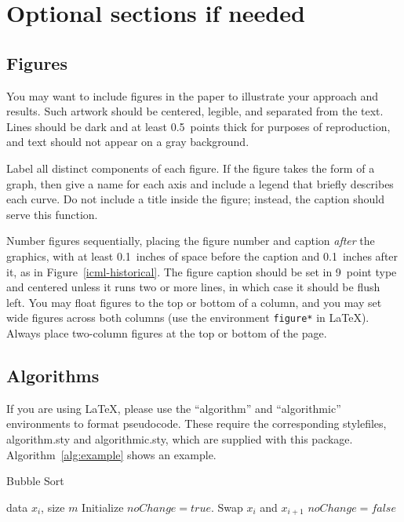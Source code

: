\documentclass{article}
\begin{document}
\section{Optional sections if needed}

\subsection{Figures}

You may want to include figures in the paper to illustrate
your approach and results. Such artwork should be centered,
legible, and separated from the text. Lines should be dark and at
least 0.5~points thick for purposes of reproduction, and text should
not appear on a gray background.

Label all distinct components of each figure. If the figure takes the
form of a graph, then give a name for each axis and include a legend
that briefly describes each curve. Do not include a title inside the
figure; instead, the caption should serve this function.

Number figures sequentially, placing the figure number and caption
\emph{after} the graphics, with at least 0.1~inches of space before
the caption and 0.1~inches after it, as in
Figure~\ref{icml-historical}. The figure caption should be set in
9~point type and centered unless it runs two or more lines, in which
case it should be flush left. You may float figures to the top or
bottom of a column, and you may set wide figures across both columns
(use the environment \texttt{figure*} in \LaTeX). Always place
two-column figures at the top or bottom of the page.

\subsection{Algorithms}

If you are using \LaTeX, please use the ``algorithm'' and ``algorithmic''
environments to format pseudocode. These require
the corresponding stylefiles, algorithm.sty and
algorithmic.sty, which are supplied with this package.
Algorithm~\ref{alg:example} shows an example.

\begin{algorithm}[tb]
   \caption{Bubble Sort}
   \label{alg:example}
\begin{algorithmic}
    data $x_i$, size $m$
   \REPEAT
   \STATE Initialize $noChange = true$.
   \STATE Swap $x_i$ and $x_{i+1}$
   \STATE $noChange = false$
   \ENDIF
   \ENDFOR
\end{algorithmic}
\end{algorithm}
\end{document}

